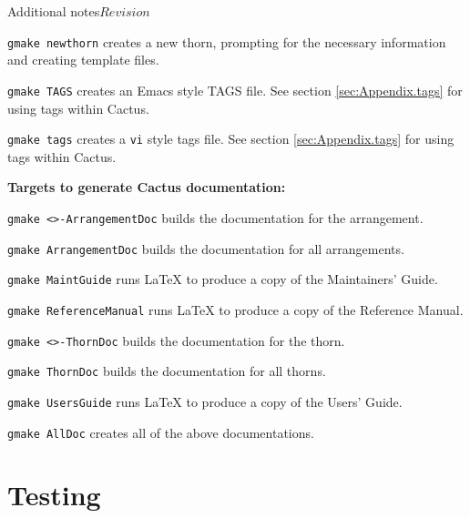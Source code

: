 \begin{cactuspart}{Additional notes}{}{$Revision$}
\begin{Lentry}
\item [\texttt{gmake newthorn}] creates a new thorn, prompting for the necessary
  information and creating template files.

\item [\texttt{gmake TAGS}] creates an Emacs style TAGS file. See section
  \ref{sec:Appendix.tags} for using tags within Cactus.

\item [\texttt{gmake tags}] creates a \texttt{vi} style tags file. See section
  \ref{sec:Appendix.tags} for using tags within Cactus.

\end{Lentry}

{\bf Targets to generate Cactus documentation:}
\label{sec:OtherGmakeTargetsDoc}

\begin{Lentry}

\item[\texttt{gmake <\var{arrangement}>-ArrangementDoc}] builds the
documentation for the arrangement.

\item[\texttt{gmake ArrangementDoc}] builds the documentation for all
arrangements.

\item [\texttt{gmake MaintGuide}] runs LaTeX to produce a copy of the
Maintainers' Guide.

\item [\texttt{gmake ReferenceManual}] runs LaTeX to produce a copy of the
Reference Manual.

\item[\texttt{gmake <\var{thorn}>-ThornDoc}] builds the documentation for the
thorn.

\item[\texttt{gmake ThornDoc}] builds the documentation for all thorns.

\item [\texttt{gmake UsersGuide}] runs LaTeX to produce a copy of the Users'
Guide.

\item [\texttt{gmake AllDoc}] creates all of the above documentations.

\end{Lentry}


\section{Testing}
\label{sec:testing}


\end{cactuspart}
